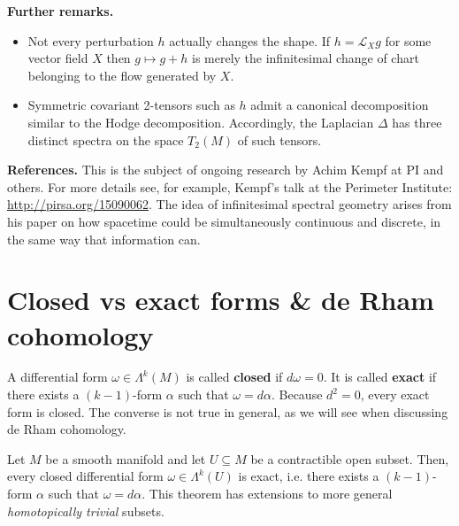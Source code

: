 \documentclass[../geometry_main.tex]{subfiles}
\begin{document}
\begin{mytheorem}
\noindent
\textbf{Further remarks.}
\begin{itemize}
\item Not every perturbation \(h\) actually changes the shape.  If \(h=\mathcal{L}_X g\) for some vector field \(X\) then \(g\mapsto g+h\) is merely the infinitesimal change of chart belonging to the flow generated by \(X\).
\item Symmetric covariant 2-tensors such as \(h\) admit a canonical decomposition similar to the Hodge decomposition.  Accordingly, the Laplacian \(\Delta\) has three distinct spectra on the space \(T_2(M)\) of such tensors.
\end{itemize}

\noindent
\textbf{References.}
This is the subject of ongoing research by Achim Kempf at PI and others.
For more details see, for example, Kempf's talk at the Perimeter Institute: \url{http://pirsa.org/15090062}.
The idea of infinitesimal spectral geometry arises from his paper on how spacetime could be simultaneously continuous and discrete, in the same way that information can.

\end{mytheorem}



\section{Closed vs exact forms \& de Rham cohomology}

\begin{mytheorem}
A differential form \(\omega \in \Lambda^k (M)\) is called \textbf{closed} if \(d\omega = 0\).
It is called \textbf{exact} if there exists a \((k-1)\)-form \(\alpha\) such that \(\omega = d\alpha\).
Because \(d^2 = 0\), every exact form is closed.
The converse is not true in general, as we will see when discussing de Rham cohomology.
\end{mytheorem}


\begin{theorem}
Let \(M\) be a smooth manifold and let \(U \subseteq M\) be a contractible open subset.
Then, every closed differential form \(\omega \in \Lambda^k (U)\) is exact, i.e. there exists a \((k-1)\)-form \(\alpha\) such that \(\omega = d\alpha\).
This theorem has extensions to more general \emph{homotopically trivial} subsets.
\end{theorem}
\end{document}
